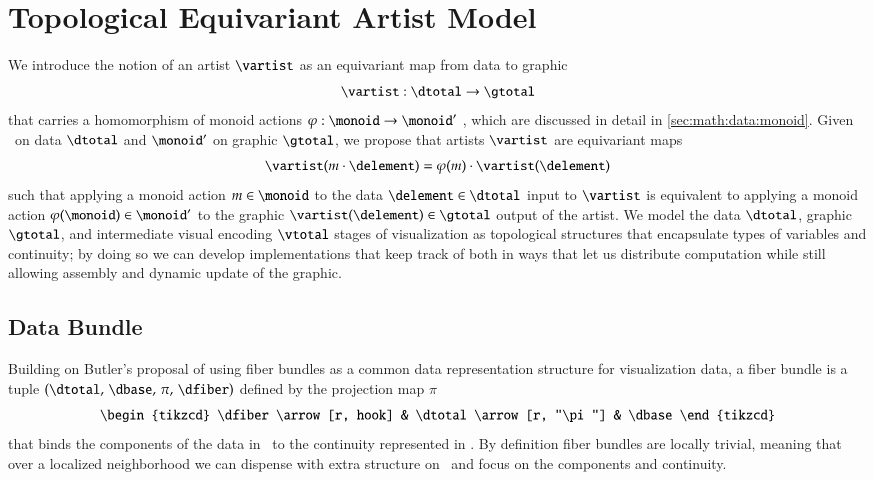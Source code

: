 \documentclass[journal]{vgtc}                %
\begin{document}
\section{Topological Equivariant Artist Model}
\label{sec:math}
We introduce the notion of an artist $\mathscr{\vartist}$ as an equivariant map from data to graphic
\begin{equation}
    \label{eq:artist}
    \mathscr{\vartist}: \mathscr{\dtotal} \rightarrow \mathscr{\gtotal}
\end{equation}
that carries a homomorphism of monoid actions $\varphi: \monoid \rightarrow \monoid^{\prime}$ \cite{cegarraCohomologyMonoidsOperators2019}, which are discussed in detail in \autoref{sec:math:data:monoid}. Given \monoid\ on data $\mathscr{\dtotal}$ and $\monoid^{\prime}$ on graphic $\mathscr{\gtotal}$, we propose that artists $\mathscr{\vartist}$ are equivariant maps 
\begin{equation}
\mathscr{\vartist}(m\cdot \delement) = \varphi(m)\cdot\mathscr{\vartist}(\delement) 
\end{equation}
such that applying a monoid action $m \in \monoid$ to the data $\delement \in \mathscr{\dtotal}$ input to $\mathscr{\vartist}$ is equivalent to applying a monoid action $\varphi(\monoid) \in \monoid^{\prime}$ to the graphic $\vartist(\delement) \in \mathscr{\gtotal}$ output of the artist.
We model the data $\mathscr{\dtotal}$, graphic $\mathscr{\gtotal}$, and intermediate visual encoding $\mathscr{\vtotal}$ stages of visualization as topological structures that encapsulate types of variables and continuity; by doing so we can develop implementations that keep track of both in ways that let us distribute computation while still allowing assembly and dynamic update of the graphic. 
\subsection{Data Bundle}
\label{sec:math:data}
Building on Butler's proposal of using fiber bundles as a common data representation structure for visualization data\cite{butlerVectorBundleClassesForm1992, butlerVisualizationModelBased1989}, a fiber bundle is a tuple $(\dtotal,\,\dbase,\,\pi ,\,\dfiber)$ defined by the projection map $\pi$
\begin{equation}
    \label{eq:fiber_bundle}
    \begin{tikzcd}
        \dfiber \arrow[r, hook] & \dtotal \arrow[r, "\pi"] & \dbase
    \end{tikzcd}
\end{equation}
that binds the components of the data in \dfiber\ to the continuity represented in \dbase. By definition fiber bundles are locally trivial\cite{spanier1989algebraic,LocallyTrivialFibre}, meaning that over a localized neighborhood we can dispense with extra structure on \dtotal\ and focus on the components and continuity.
\end{document}
